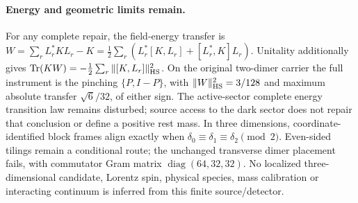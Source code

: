 \paragraph{Energy and geometric limits remain.}
For any complete repair, the field-energy transfer is
$W=\sum_rL_r^*KL_r-K
=\tfrac12\sum_r(L_r^*[K,L_r]+[L_r^*,K]L_r)$.
Unitality additionally gives
$\operatorname{Tr}(KW)=-\tfrac12\sum_r\|[K,L_r]\|_{\rm HS}^2$.
On the original two-dimer carrier the full instrument is the pinching
$\{P,I-P\}$, with $\|W\|_{\rm HS}^2=3/128$ and maximum absolute
transfer $\sqrt6/32$, of either sign.  The active-sector complete
energy transition law remains disturbed; source access to the dark
sector does not repair that conclusion or define a positive rest mass.
In three dimensions, coordinate-identified block frames align exactly
when $\delta_0\equiv\delta_1\equiv\delta_2\pmod2$.
Even-sided tilings remain a conditional route; the unchanged transverse
dimer placement fails, with commutator Gram matrix
$\operatorname{diag}(64,32,32)$.  No localized three-dimensional
candidate, Lorentz spin, physical species, mass calibration or
interacting continuum is inferred from this finite source/detector.
